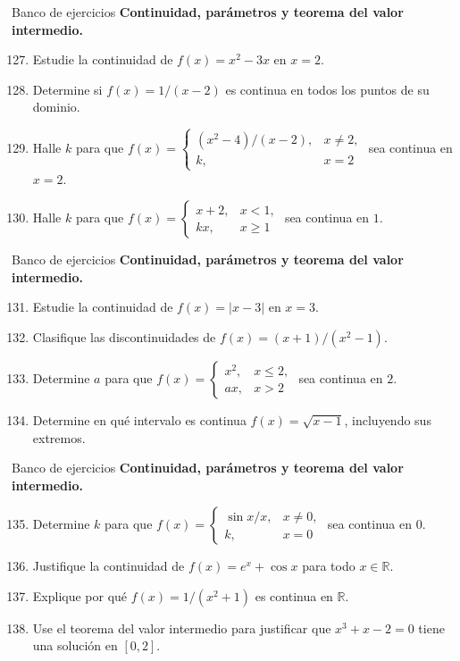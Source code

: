 \documentclass[12pt,aspectratio=169]{beamer}
\newcommand{\R}{\mathbb{R}}
\begin{document}
\begin{frame}[t,allowframebreaks]{Banco de ejercicios}
\small
\noindent \textbf{Continuidad, parámetros y teorema del valor intermedio.}\par\smallskip
\begin{enumerate}\setcounter{enumi}{126}
\item Estudie la continuidad de $f(x)=x^2-3x$ en $x=2$.
\item Determine si $f(x)=1/(x-2)$ es continua en todos los puntos de su dominio.
\item Halle $k$ para que $f(x)=\begin{cases}(x^2-4)/(x-2),&x\ne2,\\k,&x=2\end{cases}$ sea continua en $x=2$.
\item Halle $k$ para que $f(x)=\begin{cases}x+2,&x<1,\\kx,&x\ge1\end{cases}$ sea continua en $1$.
\end{enumerate}
\end{frame}


\begin{frame}[t,allowframebreaks]{Banco de ejercicios}
\small
\noindent \textbf{Continuidad, parámetros y teorema del valor intermedio.}\par\smallskip
\begin{enumerate}\setcounter{enumi}{130}
\item Estudie la continuidad de $f(x)=|x-3|$ en $x=3$.
\item Clasifique las discontinuidades de $f(x)=(x+1)/(x^2-1)$.
\item Determine $a$ para que $f(x)=\begin{cases}x^2,&x\le2,\\ax,&x>2\end{cases}$ sea continua en $2$.
\item Determine en qué intervalo es continua $f(x)=\sqrt{x-1}$, incluyendo sus extremos.
\end{enumerate}
\end{frame}


\begin{frame}[t,allowframebreaks]{Banco de ejercicios}
\small
\noindent \textbf{Continuidad, parámetros y teorema del valor intermedio.}\par\smallskip
\begin{enumerate}\setcounter{enumi}{134}
\item Determine $k$ para que $f(x)=\begin{cases}\sin x/x,&x\ne0,\\k,&x=0\end{cases}$ sea continua en $0$.
\item Justifique la continuidad de $f(x)=e^x+\cos x$ para todo $x\in\R$.
\item Explique por qué $f(x)=1/(x^2+1)$ es continua en $\R$.
\item Use el teorema del valor intermedio para justificar que $x^3+x-2=0$ tiene una solución en $[0,2]$.
\end{enumerate}
\end{frame}
\end{document}

